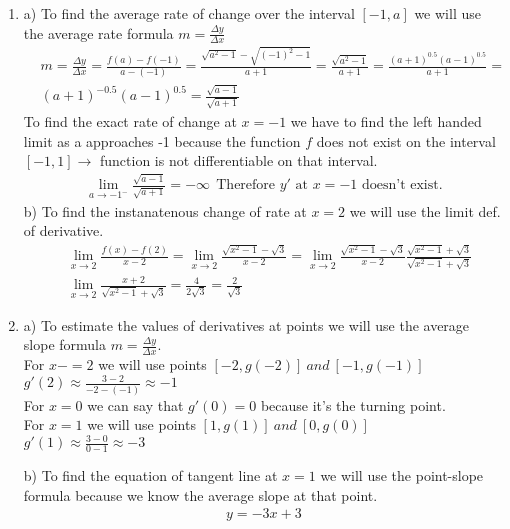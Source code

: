 \documentclass[13pt, a4paper, twoside]{article}
\begin{document}
\begin{enumerate}
    \large \onehalfspacing
    \item a) To find the average rate of change over the interval $[-1, a]$ we will use
    the average rate formula $m=\frac{\Delta y}{\Delta x}$
    \begin{align*}
        &m = \frac{\Delta y}{\Delta x} = \frac{f(a)-f(-1)}{a-(-1)} =
        \frac{\sqrt{a^2-1} - \sqrt{(-1)^2-1}}{a+1} = \frac{\sqrt{a^2-1}}{a+1} =
        \frac{(a+1)^{0.5}(a-1)^{0.5}}{a+1} =\\ &(a+1)^{-0.5} (a-1)^{0.5} = \frac{\sqrt{a-1}}{\sqrt{a+1}}
    \end{align*}
    To find the exact rate of change at $x=-1$ we have to find the left handed limit
    as a approaches -1 because the function $f$ does not exist on the interval $[-1, 1] \to$ function
    is not differentiable on that interval.
    \begin{align*}
        \lim_{a \to -1^-} \frac{\sqrt{a-1}}{\sqrt{a+1}} = -\infty\: \: \text{Therefore $y'$ at $x=-1$ doesn't exist}.
    \end{align*} 
    b) To find the instanatenous change of rate at $x=2$ we will use the limit def. of derivative.
    \begin{align*}
        &\lim_{x \to 2} \frac{f(x)-f(2)}{x-2} = \lim_{x \to 2} \frac{\sqrt{x^2-1}-\sqrt{3}}{x-2}
        = \lim_{x \to 2} \frac{\sqrt{x^2-1}-\sqrt{3}}{x-2} \frac{\sqrt{x^2-1}+\sqrt{3}}{\sqrt{x^2-1}+\sqrt{3}}\\
        &\lim_{x \to 2} \frac{x+2}{\sqrt{x^2-1}+\sqrt{3}} = \frac{4}{2\sqrt{3}} = \frac{2}{\sqrt{3}}
    \end{align*}

    \item a) To estimate the values of derivatives at points we will use the average slope
    formula $m=\frac{\Delta y}{\Delta x}$.\\
    For $x-=2$ we will use points $[-2, g(-2)]\: and \: [-1, g(-1)]$\\
    $g'(2)\approx\frac{3-2}{-2 - (-1)}\approx -1$\\
    For $x=0$ we can say that $g'(0)=0$ because it's the turning point.\\
    For $x=1$ we will use points $[1, g(1)]\: and\: [0, g(0)]$\\
    $g'(1) \approx  \frac{3-0}{0-1} \approx -3$
    
    b) To find the equation of tangent line at $x=1$ we will use the point-slope formula because
    we know the average slope at that point.
    \begin{align*}
        y = -3x +3
    \end{align*}


\end{enumerate}
\end{document}
